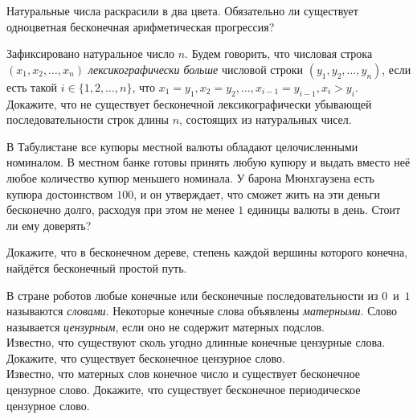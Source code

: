 \resetproblem \begingroup %
    \def\jeolmdate{7 июня 2018 г., пара 1}%
    \def\jeolmgroupname{Гексаэдры}%
    \def\jeolmauthors{Коваленко К., Кушнир А., Тихонов Ю.}%
\jeolmheader \endgroup


\begin{problems}

\item Натуральные числа раскрасили в два цвета. Обязательно ли существует одноцветная бесконечная арифметическая прогрессия? 

\item Зафиксировано натуральное число $n$. Будем говорить, что числовая строка $(x_1, x_2, \ldots, x_n)$ \emph{лексикографически больше} числовой строки $(y_1, y_2, \ldots, y_n)$, если есть такой $i \in \{ 1, 2, \ldots, n \}$, что $x_1 = y_1, x_2 = y_2, \ldots, x_{i - 1} = y_{i - 1}, x_i > y_i$.\\
 Докажите, что не существует бесконечной лексикографически убывающей последовательности строк длины $n$, состоящих из натуральных чисел.

\item В Табулистане все купюры местной валюты обладают целочисленными номиналом. В местном банке готовы принять любую купюру и выдать вместо неё любое количество купюр меньшего номинала. У барона Мюнхгаузена есть купюра достоинством $100$, и он утверждает, что сможет жить на эти деньги бесконечно долго, расходуя при этом не менее $1$ единицы валюты в день. Стоит ли ему доверять?

\item {} Докажите, что в бесконечном дереве, степень каждой вершины которого конечна, найдётся бесконечный простой путь.

\item В стране роботов любые конечные или бесконечные последовательности из $0$~и~$1$ называются \emph{словами}. Некоторые конечные слова объявлены \emph{матерными}. Слово называется \emph{цензурным}, если оно не содержит матерных подслов.\\
\subproblem Известно, что существуют сколь угодно длинные конечные цензурные слова. Докажите, что существует бесконечное цензурное слово.\\
\subproblem Известно, что матерных слов конечное число и существует бесконечное цензурное слово. Докажите, что существует бесконечное периодическое цензурное слово.


\end{problems}
